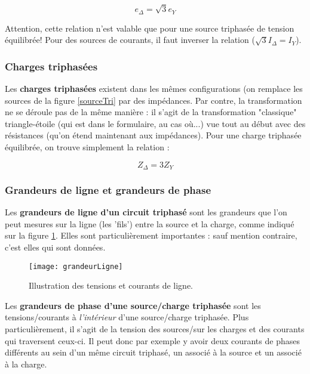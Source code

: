 \begin{equation}
e_{\Delta} = \sqrt{3} e_{Y}
\end{equation}

Attention, cette relation n'est valable que pour une source triphasée de tension équilibrée! Pour des sources de courants, il faut inverser la relation ($ \sqrt{3} I_{\Delta} = I_{Y}$).

\subsubsection*{Charges triphasées}
Les \textbf{charges triphasées} existent dans les mêmes configurations (on remplace les sources de la figure \ref{sourceTri} par des impédances. Par contre, la transformation ne se déroule pas de la même manière : il s'agit de la transformation "classique" triangle-étoile (qui est dans le formulaire, au cas où...) vue tout au début avec des résistances (qu'on étend maintenant aux impédances). Pour une charge triphasée équilibrée, on trouve simplement la relation :

\begin{equation}
Z_{\Delta} = 3 Z_{Y}
\end{equation}

\subsubsection*{Grandeurs de ligne et grandeurs de phase}
Les \textbf{grandeurs de ligne d'un circuit triphasé} sont les grandeurs que l'on peut mesures sur la ligne (les 'fils') entre la source et la charge, comme indiqué sur la figure \ref{grandeurLigne}. Elles sont particulièrement importantes : sauf mention contraire, c'est elles qui sont données.

\begin{figure}[h]
	\centering
    \texttt{[image: grandeurLigne]}
    \caption{Illustration des tensions et courants de ligne.}
    \label{grandeurLigne}
\end{figure}

Les \textbf{grandeurs de phase d'une source/charge triphasée} sont les tensions/courants à \textit{l'intérieur} d'une source/charge triphasée. Plus particulièrement, il s'agit de la tension des sources/sur les charges et des courants qui traversent ceux-ci. Il peut donc par exemple y avoir deux courants de phases différents au sein d'un même circuit triphasé, un associé à la source et un associé à la charge.

